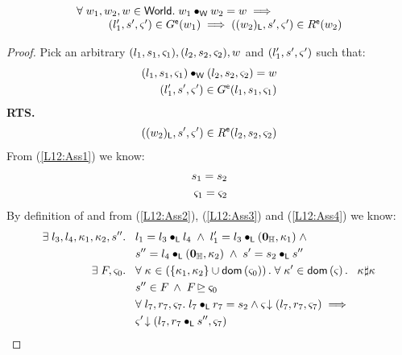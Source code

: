 \begin{lemma}[]\label{lem:extendGContainment}
%
\[
\begin{array}{l}
	\forall\; w_1, w_2, w \in \textsf{World}.\; w_1 \bullet_{\textsf{W}} w_2 = w \implies\\
	\hspace*{1cm}(l'_1, s', \varsigma_{}') \in G^{\textsf{e}}(w_1) \implies ((w_2)_{\textsf{L}}, s', \varsigma_{}') \in R^{\textsf{e}}(w_2)
\end{array}
\]
%
\begin{proof} Pick an arbitrary $(l_1, s_1, \varsigma_{1}), (l_2, s_2, \varsigma_{2}), w$ and $(l'_1, s', \varsigma_{}')$ such that:
%
\begin{align}
	(l_1, s_1, \varsigma_{1}) \bullet_{\textsf{W}} (l_2, s_2, \varsigma_{2}) = w \label{L12:Ass1}\\
	(l'_1, s', \varsigma_{}') \in G^{\textsf{e}}(l_1, s_1, \varsigma_{1}) \label{L12:Ass2}
\end{align}
%
\textbf{RTS.}
%
\begin{align}
	((w_2)_{\textsf{L}}, s', \varsigma_{}') \in R^{\textsf{e}}(l_2, s_2, \varsigma_{2}) \label{L12:Goal}
\end{align}
From (\ref{L12:Ass1}) we know:
%
\begin{align}
	s_1 = s_2 \label{L12:Ass3}\\
	\varsigma_{1} = \varsigma_{2} \label{L12:Ass4}
\end{align}
%
By definition of \extendG and from (\ref{L12:Ass2}), (\ref{L12:Ass3}) and (\ref{L12:Ass4}) we know:
%
\begin{align}
	\exsts{l_3, l_4, \ca{1}, \ca{2}, s''} \hspace*{0.2cm}& l_1 = l_3 \composeL l_4 \;\land\; l'_1 = l_3 \composeL (\unitH, \ca{1}) \;\land \label{L12:Ass5}\\
	& s'' = l_4 \composeL (\unitH, \ca{2}) \;\land\; s' = s_2 \composeL s'' \label{L12:Ass6}\\
%
	\exsts{F, \amod{0}} \hspace*{0.2cm} & \for{\ca{} \in \left(\{\ca{1}, \ca{2}\} \cup \dom{\amod{0}}\right)} \for{\ca{}' \in \dom{\amod{}}}\;\; \ca{} \disjoint \ca{} \label{L12:Ass7}\\
%
	& s'' \in \fence{} \;\land\; \fence{} \strictfences \amod{0} \label{L12:fence}\\
%	
	&\for{l_7, r_7, \amod{7}} l_7 \composeL r_7 = s_2 \land \extendsAM{\amod{}}{l_7}{r_7}{\amod{7}} \implies \nonumber\\ 
	&\extendsAM{\amod{}'}{l_7}{r_7 \composeL s''}{\amod{7}}  \label{L12:Ass9}\\

\end{align}
\end{proof}
\end{lemma}
